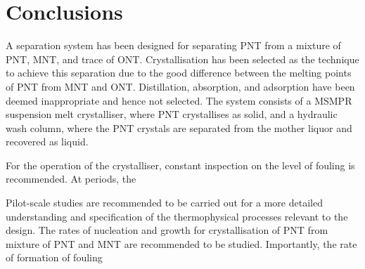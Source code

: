 \section{Conclusions}\label{separation conclusions}

A separation system has been designed for separating PNT from a mixture of PNT, MNT, and trace of ONT. Crystallisation has been selected as the technique to achieve this separation due to the good difference between the melting points of PNT from MNT and ONT. Distillation, absorption, and adsorption have been deemed inappropriate and hence not selected. The system consists of a MSMPR suspension melt crystalliser, where PNT crystallises as solid, and a hydraulic wash column, where the PNT crystals are separated from the mother liquor and recovered as liquid. 

For the operation of the crystalliser, constant inspection on the level of fouling is recommended. At periods, the 

Pilot-scale studies are recommended to be carried out for a more detailed understanding and specification of the thermophysical processes relevant to the design. The rates of nucleation and growth for crystallisation of PNT from mixture of PNT and MNT are recommended to be studied. Importantly, the rate of formation of fouling 
